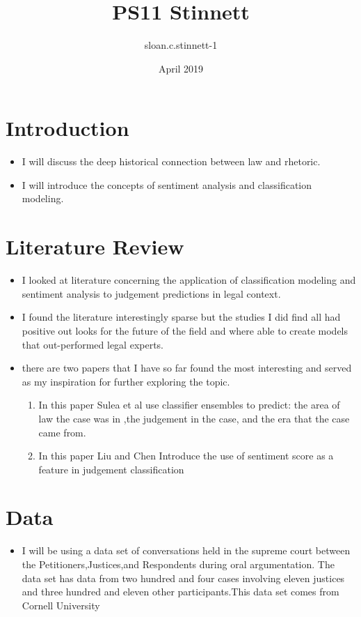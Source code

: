 \documentclass{article}
\title{PS11 Stinnett}
\author{sloan.c.stinnett-1 }
\date{April 2019}
\begin{document}
\maketitle

\section{Introduction}
\begin{itemize}
    \item I will discuss the deep historical connection between law and rhetoric.
    \item I will introduce the concepts of sentiment analysis and classification modeling.
\end{itemize}
\section{Literature Review}
\begin{itemize}
    \item I looked at literature concerning the application of classification modeling and sentiment analysis to judgement predictions in legal context.
    \item I found the literature interestingly sparse but the studies I did find all had positive out looks for the future of the field and where able to create models that out-performed legal experts.
    \item there are two papers that I have so far found the most interesting and served as my inspiration for further exploring the topic.
    \begin{enumerate}
        \item \cite{sulea_exploring_2017} In this paper Sulea et al use classifier ensembles to predict: the area of law the case was in ,the judgement in the case, and the era that the case came from. 
        \item \cite{liu_two-phase_2018} In this paper Liu and Chen Introduce the use of sentiment score as a feature in judgement classification
    \end{enumerate}
\end{itemize}
\section{Data}
\begin{itemize}
    \item I will be using a data set of conversations held in the supreme court between the Petitioners,Justices,and Respondents during oral argumentation. The data set has data from two hundred and four cases involving eleven justices and three hundred and eleven other participants.This data set comes from Cornell University 
\end{itemize}
\end{document}
